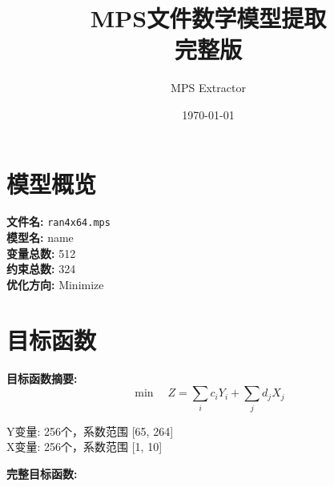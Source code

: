 \documentclass[a4paper,10pt]{article}
\title{MPS文件数学模型提取\\{\large 完整版}}
\author{MPS Extractor}
\date{\today}
\begin{document}
\maketitle
\tableofcontents
\newpage

\section{模型概览}

\textbf{文件名:} \texttt{ran4x64.mps} \\
\textbf{模型名:} name \\
\textbf{变量总数:} 512 \\
\textbf{约束总数:} 324 \\
\textbf{优化方向:} Minimize \\

\section{目标函数}

\textbf{目标函数摘要:}
\begin{equation}
\min \quad Z = \sum_{i} c_i Y_i + \sum_{j} d_j X_j
\end{equation}

Y变量: 256个，系数范围 [65, 264] \\
X变量: 256个，系数范围 [1, 10]

\textbf{完整目标函数:}
\end{document}
